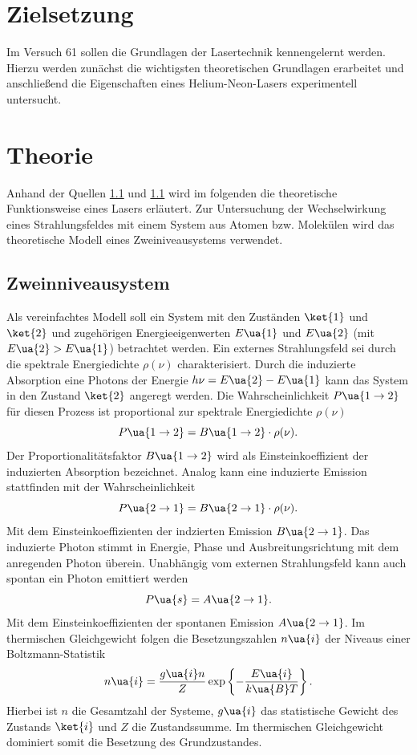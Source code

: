 \setcounter{page}{1}
\section*{Zielsetzung}
Im Versuch 61 sollen die Grundlagen der Lasertechnik kennengelernt werden. Hierzu werden zunächst die
wichtigsten theoretischen Grundlagen erarbeitet und anschließend die Eigenschaften eines Helium-Neon-Lasers
experimentell untersucht.
\section{Theorie}
Anhand der Quellen \ref{} und \ref{} wird im folgenden die theoretische Funktionsweise eines Lasers
erläutert. Zur Untersuchung der Wechselwirkung eines Strahlungsfeldes mit einem System aus Atomen bzw. Molekülen
wird das theoretische Modell eines Zweiniveausystems verwendet.
\subsection{Zweinniveausystem}
Als vereinfachtes Modell soll ein System mit den Zuständen $\ket{1}$ und $\ket{2}$ und zugehörigen Energieeigenwerten
$E\ua{1}$ und $E\ua{2}$ (mit $E\ua{2}> E\ua{1}$) betrachtet werden. Ein externes Strahlungsfeld sei durch die spektrale Energiedichte $\rho(\nu)$
charakterisiert. Durch die induzierte Absorption eine Photons der Energie $h \nu = E\ua{2} - E\ua{1}$ kann das
System in den Zustand $\ket{2}$ angeregt werden. Die Wahrscheinlichkeit $P\ua{1\rightarrow 2}$ für diesen Prozess ist proportional
zur spektrale Energiedichte $\rho(\nu)$
\begin{equation}
  P\ua{1\rightarrow 2} = B\ua{1\rightarrow 2}\cdot\rho(\nu).
\end{equation}
Der Proportionalitätsfaktor $B\ua{1\rightarrow 2}$ wird als Einsteinkoeffizient der induzierten Absorption bezeichnet. Analog kann
eine induzierte Emission stattfinden mit der Wahrscheinlichkeit
\begin{equation}
  P\ua{2\rightarrow 1} = B\ua{2\rightarrow 1}\cdot\rho(\nu).
\end{equation}
Mit dem Einsteinkoeffizienten der indzierten Emission $B\ua{2\rightarrow1}$.
Das induzierte Photon stimmt in Energie, Phase und Ausbreitungsrichtung mit dem anregenden Photon überein.
Unabhängig vom externen Strahlungsfeld
kann auch spontan ein Photon emittiert werden
\begin{equation}
  P\ua{s} = A\ua{2 \rightarrow 1}.
\end{equation}
Mit dem Einsteinkoeffizienten der spontanen Emission $A\ua{2 \rightarrow 1}$. Im thermischen Gleichgewicht folgen die Besetzungszahlen
$n\ua{i}$ der Niveaus einer Boltzmann-Statistik
\begin{equation}
  n\ua{i} = \frac{g\ua{i}n}{Z}\exp\left\{-\frac{E\ua{i}}{k\ua{B}T}\right\}.
\end{equation}
Hierbei ist $n$ die Gesamtzahl der Systeme, $g\ua{i}$ das statistische Gewicht des Zustands $\ket{i}$ und $Z$ die Zustandssumme. Im thermischen
Gleichgewicht dominiert somit die Besetzung des Grundzustandes.

